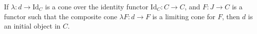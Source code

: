 If $\lambda: d \to \mathrm{Id}_C$ is a cone over the identity functor $\mathrm{Id}_C: C \to C$, and $F: J \to C$ is a functor such that the composite cone $\lambda F: d \to F$ is a limiting cone for $F$, then $d$ is an initial object in $C$.
